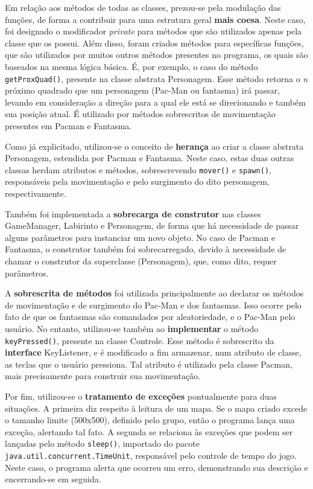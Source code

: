 \documentclass[]{article}
\begin{document}
Em relação aos métodos de todas as classes, prezou-se pela modulação das funções, de forma a contribuir para uma estrutura geral \textbf{mais coesa}. Neste caso, foi designado o modificador \textsl{private} para métodos que são utilizados apenas pela classe que os possui. Além disso, foram criados métodos para específicas funções, que são utilizados por muitos outros métodos presentes no programa, os quais são baseados na mesma lógica básica. É, por exemplo, o caso do método \texttt{getProxQuad()}, presente na classe abstrata Personagem. Esse método retorna o \textsl{n} próximo quadrado que um personagem (Pac-Man ou fantasma) irá passar, levando em consideração a direção para a qual ele está se direcionando e também sua posição atual. É utilizado por métodos sobrescritos de movimentação presentes em Pacman e Fantasma.

Como já explicitado, utilizou-se o conceito de \textbf{herança} ao criar a classe abstrata Personagem, estendida por Pacman e Fantasma. Neste caso, estas duas outras classas herdam atributos e métodos, sobrescrevendo \texttt{mover()} e \texttt{spawn()}, responsáveis pela movimentação e pelo surgimento do dito personagem, respectivamente.

Também foi implementada a \textbf{sobrecarga de construtor} nas classes GameManager, Labirinto e Personagem, de forma que há necessidade de passar alguns parâmetros para instanciar um novo objeto. No caso de Pacman e Fantasma, o construtor também foi sobrecarregado, devido à necessidade de chamar o construtor da superclasse (Personagem), que, como dito, requer parâmetros.

A \textbf{sobrescrita de métodos} foi utilizada principalmente ao declarar os métodos de movimentação e de surgimento do Pac-Man e dos fantasmas. Isso ocorre pelo fato de que os fantasmas são comandados por aleatoriedade, e o Pac-Man pelo usuário. No entanto, utilizou-se também ao \textbf{implementar} o método \texttt{keyPressed()}, presente na classe Controle. Esse método é sobrescrito da \textbf{interface} KeyListener, e é modificado a fim armazenar, num atributo de classe, as teclas que o usuário pressiona. Tal atributo é utilizado pela classe Pacman, mais precisamente para construir sua movimentação.

Por fim, utilizou-se o \textbf{tratamento de exceções} pontualmente para duas situações. A primeira diz respeito à leitura de um mapa. Se o mapa criado excede o tamanho limite (500x500), definido pelo grupo, então o programa lança uma exceção, alertando tal fato. A segunda se relaciona às exceções que podem ser lançadas pelo método \texttt{sleep()}, importado do pacote \texttt{java.util.concurrent.TimeUnit}, responsável pelo controle de tempo do jogo. Neste caso, o programa alerta que ocorreu um erro, demonstrando sua descrição e encerrando-se em seguida.
\end{document}
